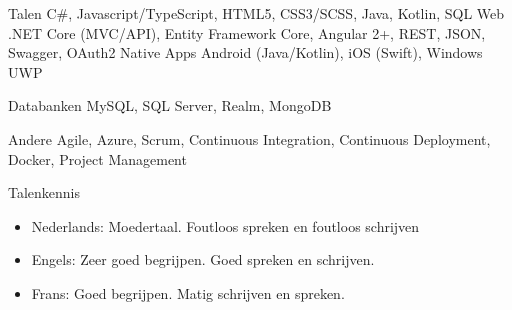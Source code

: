 


\begin{cvskills}


\cvskill
{Talen}
{C\#, Javascript/TypeScript, HTML5, CSS3/SCSS, Java, Kotlin, SQL}
\cvskill
{Web}
{.NET Core (MVC/API), Entity Framework Core, Angular 2+, REST, JSON, Swagger, OAuth2}
\cvskill
{Native Apps}
{Android (Java/Kotlin), iOS (Swift), Windows UWP}

\cvskill
{Databanken}
{MySQL, SQL Server, Realm, MongoDB}

\cvskill
{Andere}
{Agile, Azure, Scrum, Continuous Integration, Continuous Deployment, Docker, Project Management}

\cvskill
{Talenkennis} %
{
\begin{itemize}
\item {Nederlands: Moedertaal. Foutloos spreken en foutloos schrijven }
\item Engels: Zeer goed begrijpen. Goed spreken en schrijven.
\item Frans: Goed begrijpen. Matig schrijven en spreken.
\end{itemize}
} %


\end{cvskills}